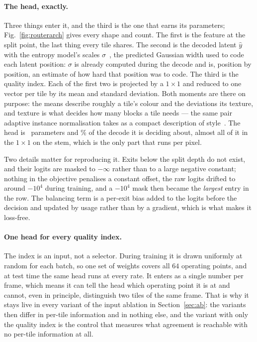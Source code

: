 \documentclass[10pt,twocolumn,letterpaper]{article}
\begin{document}
\paragraph{The head, exactly.} Three things enter it, and the third is the one
that earns its parameters; Fig.~\ref{fig:routerarch} gives every shape and
count. The first is the feature at the split point, the last thing every tile
shares. The second is the decoded latent $\hat{y}$ with the entropy model's
scales $\sigma$~\cite{balle2018}, the predicted Gaussian width used to code
each latent position: $\sigma$ is already computed during the decode and is,
position by position, an estimate of how hard that position was to code. The
third is the quality index. Each of the first two is projected by a
$1\times1$ and reduced to one vector per tile by its mean and standard
deviation. Both moments are there on purpose: the means describe roughly a
tile's colour and the deviations its texture, and texture is what decides how
many blocks a tile needs --- the same pair adaptive instance normalisation
takes as a compact description of style~\cite{adain}. The head is
\RouterParams\ parameters and \RouterCostPct\% of the decode it is deciding
about, almost all of it in the $1\times1$ on the stem, which is the only part
that runs per pixel.

Two details matter for reproducing it. Exits below the split depth do not exist,
and their logits are masked to $-\infty$ rather than to a large negative
constant; nothing in the objective penalises a constant offset, the raw logits
drifted to around $-10^4$ during training, and a $-10^4$ mask then became the
\emph{largest} entry in the row. The balancing term is a per-exit bias added to
the logits before the decision and updated by usage rather than by a gradient,
which is what makes it loss-free.

\paragraph{One head for every quality index.} The index is an input, not a
selector. During training it is drawn uniformly at random for each batch, so one
set of weights covers all $64$ operating points, and at test time the same head
runs at every rate. It enters as a single number per frame, which means it can
tell the head which operating point it is at and cannot, even in principle,
distinguish two tiles of the same frame. That is why it stays live in every
variant of the input ablation in Section~\ref{sec:ab}: the variants then differ
in per-tile information and in nothing else, and the variant with only the
quality index is the control that measures what agreement is reachable with no
per-tile information at all.
\end{document}
